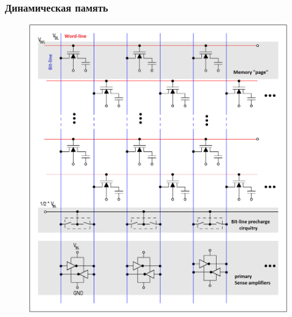 \documentclass[t,aspectratio=169]{beamer}
\begin{document}
\begin{frame}
    \frametitle{Динамическая память}
    \begin{figure}
        \begin{centering}
            \includegraphics[height=0.8\textheight]{dram}
        \end{centering}
    \end{figure}
\end{frame}
\end{document}
